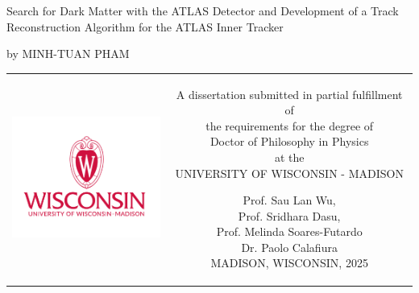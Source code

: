 \begin{titlepage}
\sffamily


\null\vspace{1cm}
{\huge Search for Dark Matter with the ATLAS Detector and Development of a Track Reconstruction Algorithm for the ATLAS Inner Tracker }  

\begin{center}
by MINH-TUAN PHAM
\end{center}

\vfill

\begin{tabular} {cc}
\parbox{0.4\textwidth}{\includegraphics[width=5cm, trim={1.1cm 0 1.cm 0}, clip]{images/uw-logo-vertical-red-print.pdf}}
&
\parbox{0.55\textwidth}{%
	A dissertation submitted in partial fulfillment of \\
	the requirements for the degree of \\ [12 pt]
	Doctor of Philosophy in Physics \\ [12 pt]
	at the \\ [9pt]
	UNIVERSITY OF WISCONSIN - MADISON
	
%
\small
%
    Prof. Sau Lan Wu,\\
    Prof. Sridhara Dasu,\\
    Prof. Melinda Soares-Futardo\\
	Dr. Paolo Calafiura \\
	[12pt]
%
MADISON, WISCONSIN, 2025}
\end{tabular}
\vspace{2cm}
\end{titlepage}



